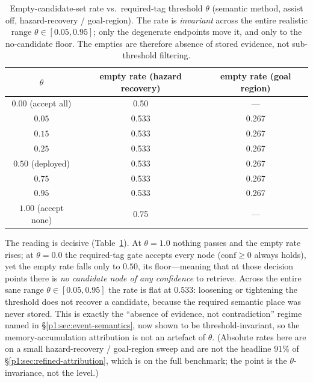 \documentclass{article}
\begin{document}
\begin{table}[h]
\caption{Empty-candidate-set rate vs.\ required-tag threshold $\theta$ (semantic method, assist off, hazard-recovery / goal-region). The rate is \emph{invariant} across the entire realistic range $\theta\in[0.05,0.95]$; only the degenerate endpoints move it, and only to the no-candidate floor. The empties are therefore absence of stored evidence, not sub-threshold filtering.}
\label{p1:tab:theta-robustness}
\centering
\small
\begin{tabular}{c c c}
\toprule
$\theta$ & empty rate (hazard recovery) & empty rate (goal region) \\
\midrule
$0.00$ (accept all) & 0.50 & --- \\
$0.05$ & 0.533 & 0.267 \\
$0.15$ & 0.533 & 0.267 \\
$0.25$ & 0.533 & 0.267 \\
$0.50$ (deployed) & 0.533 & 0.267 \\
$0.75$ & 0.533 & 0.267 \\
$0.95$ & 0.533 & 0.267 \\
$1.00$ (accept none) & 0.75 & --- \\
\bottomrule
\end{tabular}
\end{table}

The reading is decisive (Table~\ref{p1:tab:theta-robustness}). At $\theta{=}1.0$ nothing passes and the empty rate rises; at $\theta{=}0.0$ the required-tag gate accepts every node ($\mathrm{conf}\ge 0$ always holds), yet the empty rate falls only to $0.50$, its floor---meaning that at those decision points there is \emph{no candidate node of any confidence} to retrieve. Across the entire sane range $\theta\in[0.05,0.95]$ the rate is flat at $0.533$: loosening or tightening the threshold does not recover a candidate, because the required semantic place was never stored. This is exactly the ``absence of evidence, not contradiction'' regime named in \S\ref{p1:sec:event-semantics}, now shown to be threshold-invariant, so the memory-accumulation attribution is not an artefact of $\theta$. (Absolute rates here are on a small hazard-recovery / goal-region sweep and are not the headline $91\%$ of \S\ref{p1:sec:refined-attribution}, which is on the full benchmark; the point is the $\theta$-invariance, not the level.)
\end{document}
